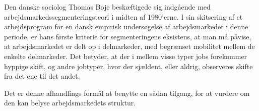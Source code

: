 Den danske sociolog Thomas Boje beskæftigede sig indgående med arbejdsmarkedssegmenteringsteori i midten af 1980'erne. I sin skitsering af et arbejdsprogram for en dansk empirisk undersøgelse af arbejdsmarkedet i denne periode, er hans første kriterie for segmenteringens eksistens, at man må påvise, at arbejdsmarkedet er delt op i delmarkeder, med begrænset mobilitet mellem de enkelte delmarkeder. Det betyder, at der i mellem visse typer jobs forekommer hyppige skift, og andre jobtyper, hvor der sjældent, eller aldrig, observeres skifte fra det ene til det andet. 

 Det er denne afhandlings formål at benytte en sådan tilgang, for at vurdere om den kan belyse arbejdsmarkedets struktur.








